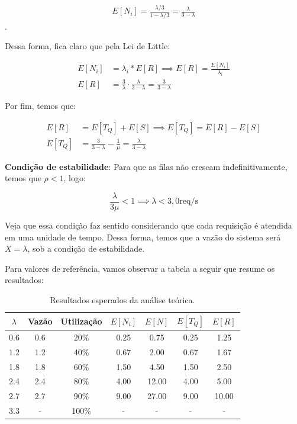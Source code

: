 \documentclass[conference]{IEEEtran}
\begin{document}
\begin{align*}
    E[N_i] = \frac{\lambda/3}{1 - \lambda/3} = \frac{\lambda}{3 - \lambda}
\end{align*}.

Dessa forma, fica claro que pela Lei de Little:

\begin{align*}
    E[N_i] &= \lambda_i * E[R] \implies E[R] = \frac{E[N_i]}{\lambda_i} \\ 
    E[R] &= \frac{3}{\lambda} \cdot \frac{\lambda}{3 - \lambda} = \frac{3}{3 - \lambda}
\end{align*}

Por fim, temos que:

\begin{align*}
    E[R] &= E[T_Q] + E[S] \implies E[T_Q] = E[R] - E[S] \\ 
E[T_Q] &= \frac{3}{3-\lambda} - \frac{1}{\mu} = \frac{\lambda}{3 - \lambda}
\end{align*}

\textbf{Condição de estabilidade}: Para que as filas não crescam indefinitivamente, temos que $\rho < 1$, logo:

$$
\frac{\lambda}{3 \mu} < 1 \implies \lambda < 3,0 \text{req/s}
$$

Veja que essa condição faz sentido considerando que cada requisição é atendida em uma unidade de tempo. Dessa forma, temos que a vazão do sistema será $X = \lambda$, sob a condição de estabilidade.

Para valores de referência, vamos observar a tabela a seguir que resume os resultados:

\begin{table}[h]
\centering
\caption{Resultados esperados da análise teórica.}
\label{tab:simulations}
    \begin{tabular}{ccccccc}
\toprule
$\lambda$ & Vazão & Utilização & $E[N_i]$ & $E[N]$ & $E[T_Q]$ & $E[R]$ \\
\midrule
0.6 & 0.6 & 20\% & 0.25 & 0.75 & 0.25 & 1.25 \\
1.2 & 1.2 & 40\% & 0.67& 2.00 & 0.67 & 1.67 \\
1.8 & 1.8 & 60\% & 1.50 & 4.50 & 1.50 & 2.50 \\
2.4 & 2.4 & 80\% & 4.00 & 12.00 & 4.00 & 5.00 \\
2.7 & 2.7 & 90\% & 9.00 & 27.00 & 9.00 & 10.00 \\
3.3 & - & 100\% & - & - & - & - \\
\bottomrule
\end{tabular}
\end{table}
\end{document}
